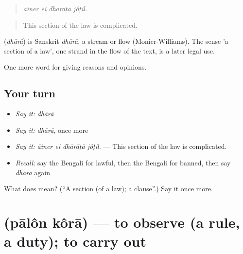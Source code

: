 \begin{quote}
   
\end{quote}

\begin{quote}
\emph{āiner ei dhārāṭā jôṭil.}
\end{quote}

\begin{quote}
This section of the law is complicated.
\end{quote}

\begin{cousinweb}
\textbf{} (\emph{dhārā}) is Sanskrit \emph{dhārā}, a stream or flow (Monier-Williams). The sense 'a section of a law', one strand in the flow of the text, is a later legal use.
\end{cousinweb}

\begin{grammarlens}[title={What you've built}]
One more word for giving reasons and opinions.
\end{grammarlens}

\subsection*{Your turn}
\begin{itemize}
\raggedright
  \item \emph{Say it:} \emph{dhārā}
  \item \emph{Say it:} \emph{dhārā}, once more
  \item \emph{Say it:} \emph{āiner ei dhārāṭā jôṭil.} — This section of the law is complicated.
  \item \emph{Recall:} say the Bengali for lawful, then the Bengali for banned, then say \emph{dhārā} again
\end{itemize}

\begin{tcolorbox}[breakable,colback=teal!4,colframe=teal!35!black,title={Before you move on}]
What does  mean? (\textquotedblleft{}A section (of a law); a clause\textquotedblright{}.) Say it once more.
\end{tcolorbox}
\section[\texorpdfstring{\bn{পালন} \bn{করা} (pālôn kôrā)}{পালন করা (pālôn kôrā)}]{  (pālôn kôrā) — to observe (a rule, a duty); to carry out}

\label{lesson:BN-C340-palon-kora}




